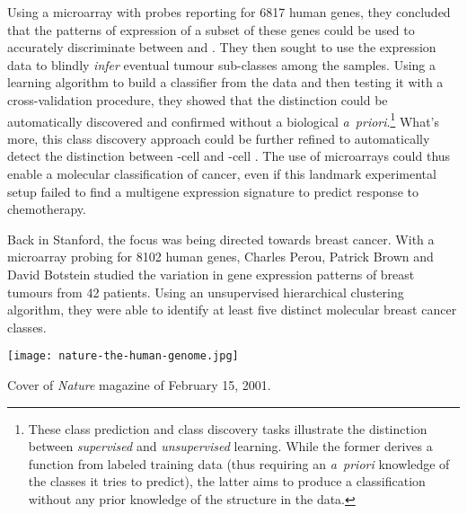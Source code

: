 Using a microarray with probes reporting for 6817 human genes, they concluded
that the patterns of expression of a subset of these genes could be used to
accurately discriminate between  and .  They then
sought to use the expression data to blindly \emph{infer} eventual tumour
\mbox{sub-classes} among the samples.  Using a learning algorithm to build a
classifier from the data and then testing it with a cross-validation procedure,
they showed that the \mbox{} distinction could be
automatically discovered and confirmed without a biological \mbox{\emph{a
    priori}}.\footnote{These class prediction and class discovery tasks
  illustrate the distinction between \emph{supervised} and \emph{unsupervised}
  learning.  While the former derives a function from labeled training data
  (thus requiring an \mbox{\emph{a priori}} knowledge of the classes it tries to
  predict), the latter aims to produce a classification without any prior
  knowledge of the structure in the data.}  What's more, this class discovery
approach could be further refined to automatically detect the distinction
between \mbox{-cell} and \mbox{-cell} .
The use of microarrays could thus enable a molecular classification of cancer,
even if this landmark experimental setup failed to find a multigene expression
signature to predict response to chemotherapy.

Back in Stanford, the focus was being directed towards breast cancer.
With a microarray probing for \num{8102} human genes, Charles Perou,
Patrick Brown and David Botstein studied the variation in gene
expression patterns of breast tumours from 42
patients.\cite{perou_molecular_2000} Using an unsupervised
hierarchical clustering algorithm, they were able to identify at least
five distinct molecular breast cancer classes.

\begin{marginfigure}%
  \texttt{[image: nature-the-human-genome.jpg]}
  \caption[Cover of \emph{Nature} magazine of February 15, 2001]{Cover of
    \emph{Nature} magazine of February 15, 2001.}
  \label{fig:human-genome-cover}
\end{marginfigure}

